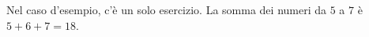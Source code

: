 
\Examples

\begin{example}
\end{example}

\begin{example}
\end{example}


\Explanation

Nel caso d'esempio, c'è un solo esercizio. La somma dei numeri da $5$ a $7$ è $5+6+7 = 18$.
